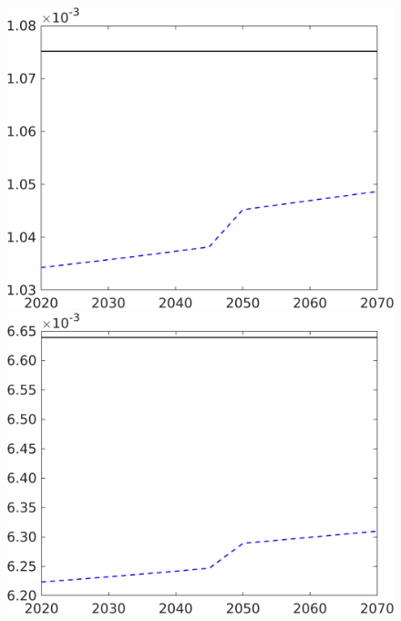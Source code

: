 \begin{figure}[h!!]
\begin{minipage}[]{0.32\textwidth}
	\end{minipage}
	\begin{minipage}[]{0.32\textwidth}
		\includegraphics[width=1\textwidth]{../../codding_model/own_basedOnFried/optimalPol_190722_tidiedUp/figures/all_10Aout22/CountTaul_modxgr_nsk_target_Lg_spillover0_sep1_extern0_PV1_etaa0.79_lgd0.png}
	\end{minipage}
	\begin{minipage}[]{0.32\textwidth}
		\includegraphics[width=1\textwidth]{../../codding_model/own_basedOnFried/optimalPol_190722_tidiedUp/figures/all_10Aout22/CountTaul_modxgr_nsk_target_Lf_spillover0_sep1_extern0_PV1_etaa0.79_lgd0.png}

\end{minipage}
\end{figure}
